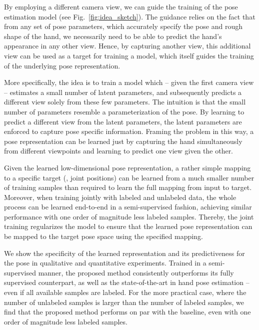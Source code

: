 \documentclass[10pt,twocolumn,letterpaper]{article}
\begin{document}
By employing a different camera view, we can guide the training of the pose estimation model
(see Fig.~\ref{fig:idea_sketch}).
The guidance relies on the fact that from any set of pose parameters,
which accurately specify the pose and rough shape of the hand,
we necessarily need to be able to predict the hand's appearance in any other view.
Hence, by capturing another view, this additional view can be used as a target
for training a model, which itself guides the training of the underlying pose representation.

More specifically, the idea is to 
train a model which -- given the first camera view --
estimates a small number of latent parameters,
and subsequently predicts a different view solely from these 
few parameters.
The intuition is that the small number of parameters 
resemble a parameterization of the pose. 
By learning to predict a different view from the latent parameters,
the latent parameters are enforced to capture pose specific information.
Framing the problem in this way, a pose representation can be learned just 
by capturing the hand simultaneously from different viewpoints and 
learning to predict one view given the other.

Given the learned low-dimensional pose representation, 
a rather simple mapping to a specific target (\eg, joint positions)
can be learned from a much smaller number of training samples
than required to learn the full mapping from input to target.
Moreover, when training jointly with labeled and unlabeled data,
the whole process can be learned end-to-end in a semi-supervised fashion,
achieving similar performance with one order of magnitude less labeled samples.
Thereby, the joint training regularizes the model to ensure that 
the learned pose representation can be mapped
to the target pose space using the specified mapping.

We show the specificity of the learned representation
and its predictiveness for the pose
in qualitative and quantitative experiments.
Trained in a semi-supervised manner, 
the proposed method consistently outperforms its fully supervised counterpart,
as well as the state-of-the-art in hand pose estimation --
even if all available samples are labeled.
For the more practical case, where the number of unlabeled samples 
is larger than the number of labeled samples,
we find that the proposed method performs on par with the baseline, even with 
one order of magnitude less labeled samples.
\end{document}
